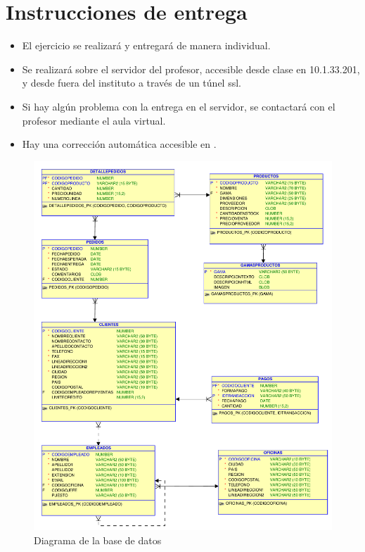 \section{Instrucciones de entrega}
\begin{itemize}
\item El ejercicio se realizará y entregará de manera individual.
\item Se realizará sobre el servidor del profesor, accesible desde clase en 10.1.33.201, y desde fuera del instituto a través de un túnel ssl.
\item Si hay algún problema con la entrega en el servidor, se contactará con el profesor mediante el aula virtual.
\item Hay una corrección automática accesible en .
\end{itemize}



\begin{figure}[h]
  \begin{center}
    \includegraphics[width=.9\textwidth]{./jardineria.pdf}
  \end{center}
  \caption{Diagrama de la base de datos}\label{fig:esquema}
\end{figure}






